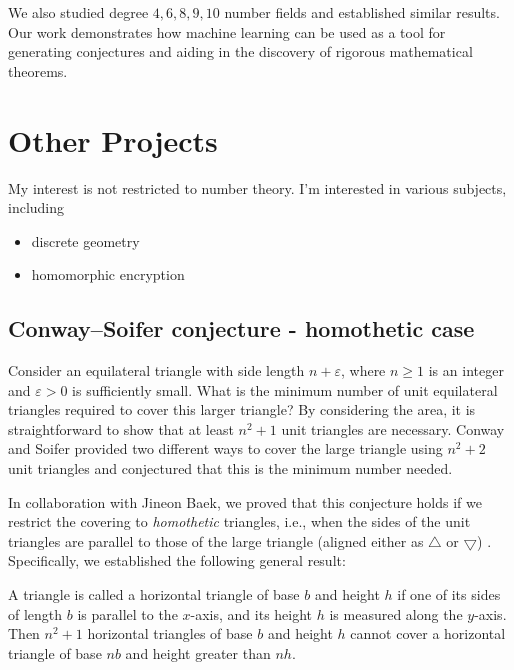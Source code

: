 \documentclass[letterpaper, 10pt]{article}
\begin{document}
We also studied degree \(4, 6, 8, 9, 10\) number fields and established similar results.
Our work demonstrates how machine learning can be used as a tool for generating conjectures and aiding in the discovery of rigorous mathematical theorems.



\section{Other Projects}

My interest is not restricted to number theory. I'm interested in various subjects, including
\begin{itemize}
    \item discrete geometry
    \item homomorphic encryption
\end{itemize}



\subsection{Conway--Soifer conjecture - homothetic case}

Consider an equilateral triangle with side length $n + \varepsilon$, where $n \ge 1$ is an integer and $\varepsilon > 0$ is sufficiently small.
What is the minimum number of unit equilateral triangles required to cover this larger triangle?
By considering the area, it is straightforward to show that at least $n^2 + 1$ unit triangles are necessary.
Conway and Soifer provided two different ways to cover the large triangle using $n^2 + 2$ unit triangles \cite{conway2005covering} and conjectured that this is the minimum number needed.

In collaboration with Jineon Baek, we proved that this conjecture holds if we restrict the covering to \emph{homothetic} triangles, i.e., when the sides of the unit triangles are parallel to those of the large triangle (aligned either as $\bigtriangleup$ or $\bigtriangledown$) \cite{baek2024equilateral}.
Specifically, we established the following general result:

\begin{theorem*}[Baek--L.] A triangle is called a horizontal triangle of base $b$ and height $h$ if one of its sides of length $b$ is parallel to the $x$-axis, and its height $h$ is measured along the $y$-axis. Then $n^2 + 1$ horizontal triangles of base $b$ and height $h$ cannot cover a horizontal triangle of base $nb$ and height greater than $nh$. \end{theorem*}
\end{document}
